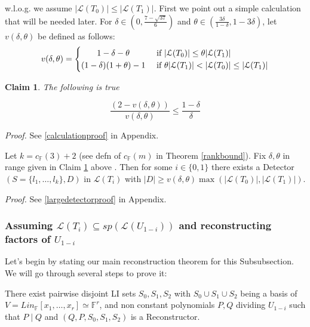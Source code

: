 \documentclass[letterpaper,USenglish,numberwithinsect]{lipics}
\newcommand{\F}{\mathbb{F}}
\newcommand{\ML}{\mathcal{L}}
\newtheorem{claim}[theorem]{Claim}
\begin{document}
w.l.o.g. we assume $|\ML(T_0)|\leq |\ML(T_1)|$.
First we point out a simple calculation that will be needed later.
For $\delta \in (0, \frac{7-\sqrt{37}}{6})$ and $\theta\in (
\frac{3\delta}{1-\delta}, 1-3\delta )$,
let $v(\delta ,\theta)$ be defined as follows:
\[
 v(\delta,\theta) =
  \begin{cases}
      \hfill 1-\delta-\theta    \hfill & \text{ if $|\ML(T_{0})|\leq \theta
|\ML(T_1)|$} \\
      \hfill (1-\delta)(1+\theta)-1 \hfill & \text{ if $\theta |\ML(T_1)| <
|\ML(T_0)| \leq |\ML(T_1)|$} \\
  \end{cases}
\]
\begin{claim}\label{calculation}
The following is true

\[
  \frac{(2-v(\delta,\theta))}{v(\delta,\theta)}\leq \frac{1-\delta}{\delta}
\]

\end{claim}

\emph{Proof.}
See \ref{calculationproof} in Appendix.




\begin{lemma}\label{largedetector}
Let $k=c_{\F}(3)+2$ (see defn of $c_\F(m)$ in Theorem \ref{rankbound}). Fix $\delta, \theta$ in range given in Claim \ref{calculation} above .
Then for some $i\in \{0,1\}$ there exists a Detector
$(S=\{l_{1},\ldots,l_{k}\},D)$ in $\ML(T_i)$  with
$|D|\geq v(\delta,\theta) \max(|\ML(T_{0})|,|\ML(T_{1})|)$.

\end{lemma}

\emph{Proof.}
 See \ref{largedetectorproof} in Appendix.








\subsubsection{Assuming $\ML(T_i)\subseteq sp(\ML(U_{1-i}))$ and reconstructing factors of $U_{1-i}$}\label{getreconstructor}

Let's begin by stating our main reconstruction theorem for this Subsubsection. We will go through several steps to prove it:

\begin{theorem}\label{foundreconstructor}
There exist pairwise disjoint LI sets $S_0,S_1,S_2$ with $S_0\cup S_1\cup
S_2$ being a basis of $V =  Lin_\F[x_1,\ldots,x_r] \simeq \F^r$, and non constant polynomials $P,Q$ dividing $ U_{1-i}$
such that $P\mid Q$ and
$(Q,P,S_0,S_1,S_2)$ is a Reconstructor.

\end{theorem}
\end{document}
